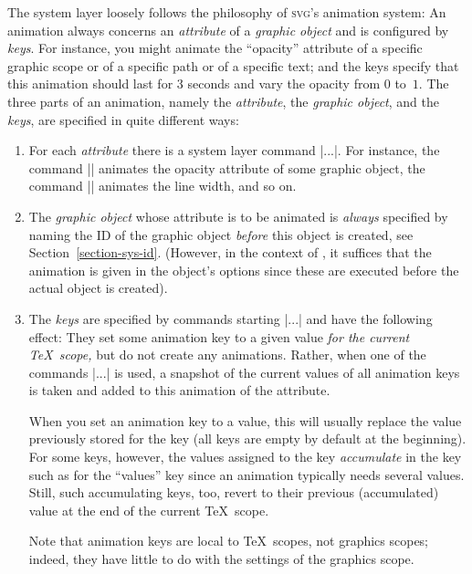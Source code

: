 The system layer loosely follows the philosophy of \textsc{svg}'s
animation system: An animation always concerns an \emph{attribute} of a
\emph{graphic object} and is configured by \emph{keys}. For instance,
you might animate the ``opacity'' attribute of a specific graphic
scope or of a specific path or of a specific text; and the keys
specify that this animation should last for 3 seconds and vary the
opacity from $0$ to~$1$. The three parts of an animation, namely the
\emph{attribute}, the \emph{graphic object}, and the \emph{keys}, are
specified in quite different ways:

\begin{enumerate}
\item For each \emph{attribute} there is a system layer command
  |\pgfsys@animate...|. For instance, the command |\pgfsys@animateopacity|
  animates the opacity attribute of some graphic object, the command
  |\pgfsys@animatelinewidth| animates the line width, and so on.
\item The \emph{graphic object} whose attribute is to be animated is
  \emph{always} specified by naming the ID of the graphic object
  \emph{before} this object is created, see
  Section~\ref{section-sys-id}. (However, in the context of
  \tikzname, it suffices that the animation is given in the object's
  options since these are executed before the actual object is
  created). 
\item The \emph{keys} are specified by commands starting
  |\pgfsys@animation@...| and have the following effect: They set some
  animation key to a given value \emph{for the current \TeX\ scope,}
  but do not create any animations. Rather, when one of the commands
  |\pgfsys@animate...| is used, a snapshot of the current values of
  all animation keys is taken and added to this animation of the
  attribute.

  When you set an animation key to a value, this will usually replace
  the value previously stored for the key (all keys are empty by
  default at the beginning). For some keys, however, the values
  assigned to the key \emph{accumulate} in the key such as for the
  ``values'' key since an animation typically needs several
  values. Still, such accumulating keys, too, revert to their previous
  (accumulated) value at the end of the current \TeX\ scope. 

  Note that animation keys are local to \TeX\ scopes, not graphics
  scopes; indeed, they have little to do with the settings of the
  graphics scope. 
\end{enumerate}


